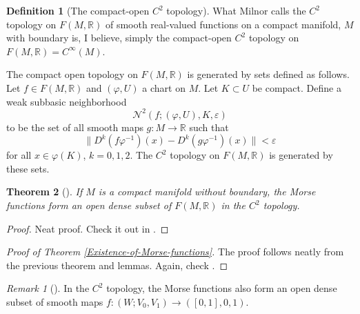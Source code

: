 \documentclass[reqno]{amsart}
\newtheorem{theorem}{Theorem}[section]
\theoremstyle{definition}
\newtheorem{definition}[theorem]{Definition}
\theoremstyle{remark}
\newtheorem*{remark}{Remark}
\begin{document}
   \begin{definition}[The compact-open $C^2$ topology]
       \cite[p. 34]{Hirsch}
       What Milnor calls the $C^2$ topology
       on $F \left( M, \mathbb{R} \right) $ of smooth
       real-valued functions on a compact manifold,
       $M$ with boundary is, I believe,
       simply the compact-open $C^2$ topology on
       $F \left( M, \mathbb{R} \right)=
       C^{\infty}(M)$.

       The compact open topology on
       $F \left( M, \mathbb{R} \right) $ is generated
       by sets defined as follows. Let
       $f \in F \left( M, \mathbb{R} \right) $ and
       $\left( \varphi ,U \right) $ a chart on
       $M$. Let $K \subset U$ be compact. Define a weak
       subbasic neighborhood
       \[
       \mathcal{N}^2 \left( f; \left( \varphi ,U \right) ,
       K, \varepsilon\right) 
       \] 
       to be the set of all
       smooth maps $g \colon M \to \mathbb{R}$ such that
        \[
       \| D^{k}\left( f \varphi^{-1} \right) (x)
       - D^{k}\left( g \varphi^{-1} \right) (x)\|< \varepsilon
       \] 
       for all $x \in \varphi (K)$, $k = 0, 1,2$.
       The $C^2$ topology on
       $F \left( M, \mathbb{R} \right) $ is generated
       by these sets.
   \end{definition}


   \begin{theorem}[]
       If $M$ is a compact manifold without boundary,
       the Morse functions form an open
       dense subset of
       $F \left( M, \mathbb{R} \right) $ in the
       $C^2$ topology.
   \end{theorem}

   \begin{proof}
       Neat proof. Check it out in \cite{Milnor-h-cobordism}.
   \end{proof}


   \begin{proof}[Proof of Theorem \ref{Existence-of-Morse-functions}]
       The proof follows neatly
       from the previous theorem and lemmas. Again,
       check \cite{Milnor-h-cobordism}.
   \end{proof}

   \begin{remark}[]
       In the $C^2$ topology, the Morse functions also
       form an open dense subset of smooth
       maps
       $f \colon \left( W; V_0, V_1 \right) \to 
       \left( \left[ 0,1 \right] , 0, 1 \right) $.
   \end{remark}
\end{document}
